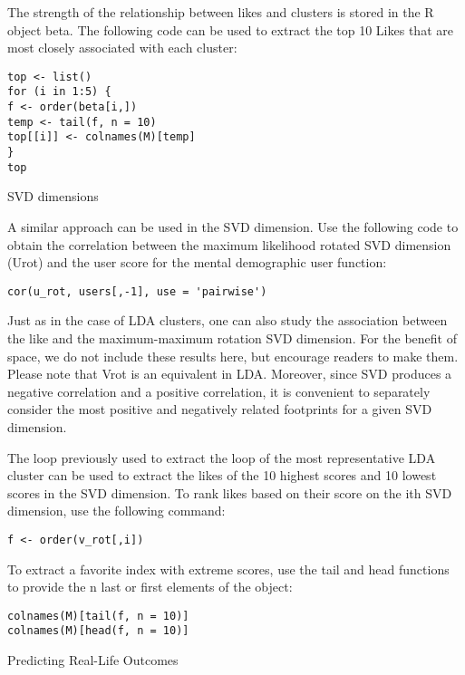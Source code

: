 The strength of the relationship between likes and clusters is 
stored in the R object beta. The following code can be used to 
extract the top 10 Likes that are most closely associated with each
 cluster:

\begin{verbatim}
top <- list()
for (i in 1:5) {
f <- order(beta[i,])
temp <- tail(f, n = 10)
top[[i]] <- colnames(M)[temp]
}
top
\end{verbatim}

SVD dimensions

A similar approach can be used in the SVD dimension. Use the 
following code to obtain the correlation between the maximum 
likelihood rotated SVD dimension (Urot) and the user score for the
 mental demographic user function:

\begin{verbatim}
cor(u_rot, users[,-1], use = 'pairwise')
\end{verbatim}

Just as in the case of LDA clusters, one can also study the 
association between the like and the maximum-maximum rotation SVD 
dimension. For the benefit of space, we do not include these 
results here, but encourage readers to make them. Please note that
 Vrot is an equivalent in LDA. Moreover, since SVD produces a 
negative correlation and a positive correlation, it is convenient 
to separately consider the most positive and negatively related 
footprints for a given SVD dimension.

The loop previously used to extract the loop of the most 
representative LDA cluster can be used to extract the likes of the
 10 highest scores and 10 lowest scores in the SVD dimension. To 
rank likes based on their score on the ith SVD dimension, use the 
following command:

\begin{verbatim}
f <- order(v_rot[,i])
\end{verbatim}

To extract a favorite index with extreme scores, use the tail and 
head functions to provide the n last or first elements of the 
object:

\begin{verbatim}
colnames(M)[tail(f, n = 10)]
colnames(M)[head(f, n = 10)]
\end{verbatim}

Predicting Real-Life Outcomes

